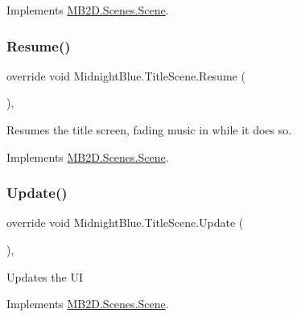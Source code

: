 Implements \hyperlink{class_m_b2_d_1_1_scenes_1_1_scene_a0661eff0223150fa8e9ea88145409e5d}{M\+B2\+D.\+Scenes.\+Scene}.

\hypertarget{class_midnight_blue_1_1_title_scene_afb0bb3ad8b2766b5d57537dc1ef22249}{}\label{class_midnight_blue_1_1_title_scene_afb0bb3ad8b2766b5d57537dc1ef22249} 
\subsubsection{\texorpdfstring{Resume()}{Resume()}}
{\footnotesize\ttfamily override void Midnight\+Blue.\+Title\+Scene.\+Resume (\begin{DoxyParamCaption}{ }\end{DoxyParamCaption})\hspace{0.3cm}{\ttfamily [inline]}, {\ttfamily [virtual]}}



Resumes the title screen, fading music in while it does so. 



Implements \hyperlink{class_m_b2_d_1_1_scenes_1_1_scene_ad13639db22b059a1b714eefd9d927735}{M\+B2\+D.\+Scenes.\+Scene}.

\hypertarget{class_midnight_blue_1_1_title_scene_a4052b2a261434462cd0150e2f4da3c5b}{}\label{class_midnight_blue_1_1_title_scene_a4052b2a261434462cd0150e2f4da3c5b} 
\subsubsection{\texorpdfstring{Update()}{Update()}}
{\footnotesize\ttfamily override void Midnight\+Blue.\+Title\+Scene.\+Update (\begin{DoxyParamCaption}{ }\end{DoxyParamCaption})\hspace{0.3cm}{\ttfamily [inline]}, {\ttfamily [virtual]}}



Updates the UI 



Implements \hyperlink{class_m_b2_d_1_1_scenes_1_1_scene_a779de7c1ab23b698dcde3a228324a991}{M\+B2\+D.\+Scenes.\+Scene}.

